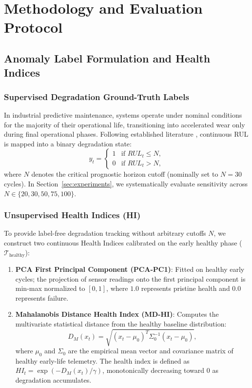 \section{Methodology and Evaluation Protocol}
\label{sec:methodology}

\subsection{Anomaly Label Formulation and Health Indices}

\subsubsection{Supervised Degradation Ground-Truth Labels}
In industrial predictive maintenance, systems operate under nominal conditions for the majority of their operational life, transitioning into accelerated wear only during final operational phases. Following established literature \cite{ramasso2014performance}, continuous RUL is mapped into a binary degradation state:
\begin{equation}
y_t = \begin{cases} 
1 & \text{if } RUL_t \le N, \\ 
0 & \text{if } RUL_t > N, 
\end{cases}
\label{eq:anomaly_label}
\end{equation}
where $N$ denotes the critical prognostic horizon cutoff (nominally set to $N=30$ cycles). In Section~\ref{sec:experiments}, we systematically evaluate sensitivity across $N \in \{20, 30, 50, 75, 100\}$.

\subsubsection{Unsupervised Health Indices (HI)}
To provide label-free degradation tracking without arbitrary cutoffs $N$, we construct two continuous Health Indices calibrated on the early healthy phase ($\mathcal{T}_{\text{healthy}}$):
\begin{enumerate}
    \item \textbf{PCA First Principal Component (PCA-PC1)}: Fitted on healthy early cycles; the projection of sensor readings onto the first principal component is min-max normalized to $[0, 1]$, where $1.0$ represents pristine health and $0.0$ represents failure.
    \item \textbf{Mahalanobis Distance Health Index (MD-HI)}: Computes the multivariate statistical distance from the healthy baseline distribution:
    \begin{equation}
    D_M(x_t) = \sqrt{(x_t - \mu_0)^T \Sigma_0^{-1} (x_t - \mu_0)},
    \label{eq:mahalanobis}
    \end{equation}
    where $\mu_0$ and $\Sigma_0$ are the empirical mean vector and covariance matrix of healthy early-life telemetry. The health index is defined as $HI_t = \exp(-D_M(x_t) / \gamma)$, monotonically decreasing toward 0 as degradation accumulates.
\end{enumerate}

